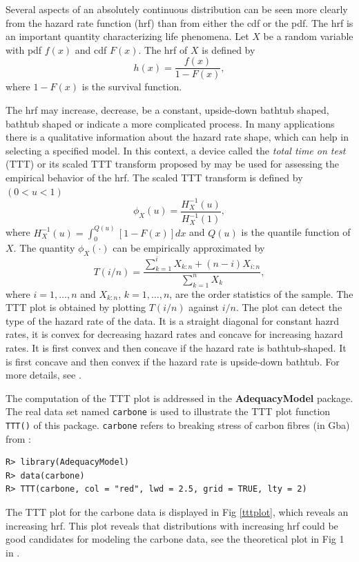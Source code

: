 \documentclass[10pt,letterpaper]{article}
\begin{document}
Several aspects of an absolutely continuous distribution can be seen more clearly from the hazard rate function (hrf) than from either the cdf or the pdf.
The hrf is an important quantity characterizing life phenomena.
Let $X$ be a random variable with pdf $f(x)$ and cdf $F(x)$.
The hrf of $X$ is defined by
\begin{equation*}
h(x) = \frac{f(x)}{1-F(x)},
\end{equation*}
where $1 - F(x)$ is the survival function.

The hrf may  increase, decrease, be a constant, upside-down bathtub shaped, bathtub shaped or indicate a more complicated process.
In many applications there is a qualitative information about the hazard rate shape,
which can help in selecting a specified model.
In this context, a device called the {\it total time on test} (TTT) or its scaled TTT transform proposed by \cite{aarset1987} may be used for
assessing the empirical behavior of the hrf.
The scaled TTT transform is defined by $(0 < u < 1)$ $$\phi_X(u) = \frac{H^{-1}_{X}(u)}{H^{-1}_{X}(1)},$$
where $H^{-1}_{X}(u) = \int_{0}^{Q(u)}[1-F(x)]dx$ and $Q(u)$ is the quantile function of $X$.
The quantity $\phi_X(\cdot)$ can be empirically approximated by
$$T(i/n) = \frac{\sum_{k=1}^i X_{k:n} + (n - i)X_{i:n}}{\sum_{k=1}^n X_{k}},$$
where $i = 1, \ldots, n$ and $X_{k:n}$, $k=1,\ldots,n$, are the order statistics of the sample.
The TTT plot is obtained by plotting $T(i/n)$ against $i/n$.
The plot can detect the type of the hazard rate of the data.
It is a straight diagonal for constant hazrd rates,
it is convex for decreasing hazard rates and concave for increasing hazard rates.
It is first convex and then concave if the hazard rate is bathtub-shaped.
It is first concave and then convex if the hazard rate is upside-down bathtub.
For more details, see \cite{aarset1987}.

The computation of the TTT plot is addressed in the \textbf{AdequacyModel} package.
The real data set named \texttt{carbone} is used to illustrate
the TTT plot function \texttt{TTT()} of this package.
\texttt{carbone} refers to breaking stress of carbon fibres (in Gba) from \cite{nicholspadgett2006}:
\begin{verbatim}
R> library(AdequacyModel)
R> data(carbone)
R> TTT(carbone, col = "red", lwd = 2.5, grid = TRUE, lty = 2)
\end{verbatim}
The TTT plot for the carbone data \cite{nicholspadgett2006} is displayed in Fig \ref{tttplot}, which reveals an increasing hrf.
This plot reveals that distributions with increasing hrf could be good candidates for modeling the carbone data, see the theoretical
plot in Fig 1 in \cite{aarset1987}.
\end{document}
